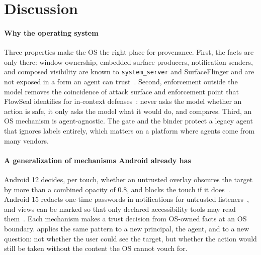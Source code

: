 \section{Discussion}\label{sec:discussion}

\paragraph{Why the operating system}
Three properties make the OS the right place for provenance. First, the facts are only there: window ownership, embedded-surface producers, notification senders, and composed visibility are known to \texttt{system\_server} and SurfaceFlinger and are not exposed in a form an agent can trust~\cite{android_accessibilitywindowinfo,android_accessibilitynodeinfo}. Second, enforcement outside the model removes the coincidence of attack surface and enforcement point that FlowSeal identifies for in-context defenses~\cite{shim2026flowseal}: \PG{} never asks the model whether an action is safe, it only asks the model what it would do, and compares. Third, an OS mechanism is agent-agnostic. The gate and the binder protect a legacy agent that ignores labels entirely, which matters on a platform where agents come from many vendors.

\paragraph{A generalization of mechanisms Android already has}
Android 12 decides, per touch, whether an untrusted overlay obscures the target by more than a combined opacity of 0.8, and blocks the touch if it does~\cite{android12_untrusted_touch}. Android 15 redacts one-time passwords in notifications for untrusted listeners~\cite{android15_otp_redaction}, and views can be marked so that only declared accessibility tools may read them~\cite{android_blog_a11y_sensitive}. Each mechanism makes a trust decision from OS-owned facts at an OS boundary. \PG{} applies the same pattern to a new principal, the agent, and to a new question: not whether the user could see the target, but whether the action would still be taken without the content the OS cannot vouch for.

